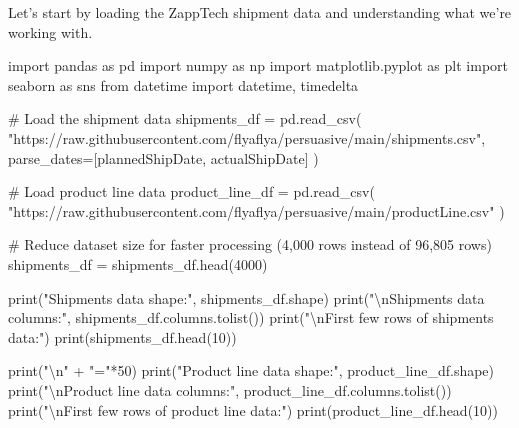 \documentclass[
]{article}
\newenvironment{Shaded}{\begin{snugshade}}{\end{snugshade}}
\newcommand{\BuiltInTok}[1]{\textcolor[rgb]{0.00,0.23,0.31}{#1}}
\newcommand{\CharTok}[1]{\textcolor[rgb]{0.13,0.47,0.30}{#1}}
\newcommand{\CommentTok}[1]{\textcolor[rgb]{0.37,0.37,0.37}{#1}}
\newcommand{\DecValTok}[1]{\textcolor[rgb]{0.68,0.00,0.00}{#1}}
\newcommand{\ImportTok}[1]{\textcolor[rgb]{0.00,0.46,0.62}{#1}}
\newcommand{\NormalTok}[1]{\textcolor[rgb]{0.00,0.23,0.31}{#1}}
\newcommand{\OperatorTok}[1]{\textcolor[rgb]{0.37,0.37,0.37}{#1}}
\newcommand{\StringTok}[1]{\textcolor[rgb]{0.13,0.47,0.30}{#1}}
\begin{document}
Let's start by loading the ZappTech shipment data and understanding what
we're working with.

\label{load-data}
\begin{Shaded}
\begin{Highlighting}[]
\ImportTok{import}\NormalTok{ pandas }\ImportTok{as}\NormalTok{ pd}
\ImportTok{import}\NormalTok{ numpy }\ImportTok{as}\NormalTok{ np}
\ImportTok{import}\NormalTok{ matplotlib.pyplot }\ImportTok{as}\NormalTok{ plt}
\ImportTok{import}\NormalTok{ seaborn }\ImportTok{as}\NormalTok{ sns}
\ImportTok{from}\NormalTok{ datetime }\ImportTok{import}\NormalTok{ datetime, timedelta}

\CommentTok{\# Load the shipment data}
\NormalTok{shipments\_df }\OperatorTok{=}\NormalTok{ pd.read\_csv(}
    \StringTok{"https://raw.githubusercontent.com/flyaflya/persuasive/main/shipments.csv"}\NormalTok{, }
\NormalTok{    parse\_dates}\OperatorTok{=}\NormalTok{[}\StringTok{\textquotesingle{}plannedShipDate\textquotesingle{}}\NormalTok{, }\StringTok{\textquotesingle{}actualShipDate\textquotesingle{}}\NormalTok{]}
\NormalTok{)}

\CommentTok{\# Load product line data}
\NormalTok{product\_line\_df }\OperatorTok{=}\NormalTok{ pd.read\_csv(}
    \StringTok{"https://raw.githubusercontent.com/flyaflya/persuasive/main/productLine.csv"}
\NormalTok{)}

\CommentTok{\# Reduce dataset size for faster processing (4,000 rows instead of 96,805 rows)}
\NormalTok{shipments\_df }\OperatorTok{=}\NormalTok{ shipments\_df.head(}\DecValTok{4000}\NormalTok{)}

\BuiltInTok{print}\NormalTok{(}\StringTok{"Shipments data shape:"}\NormalTok{, shipments\_df.shape)}
\BuiltInTok{print}\NormalTok{(}\StringTok{"}\CharTok{\textbackslash{}n}\StringTok{Shipments data columns:"}\NormalTok{, shipments\_df.columns.tolist())}
\BuiltInTok{print}\NormalTok{(}\StringTok{"}\CharTok{\textbackslash{}n}\StringTok{First few rows of shipments data:"}\NormalTok{)}
\BuiltInTok{print}\NormalTok{(shipments\_df.head(}\DecValTok{10}\NormalTok{))}

\BuiltInTok{print}\NormalTok{(}\StringTok{"}\CharTok{\textbackslash{}n}\StringTok{"} \OperatorTok{+} \StringTok{"="}\OperatorTok{*}\DecValTok{50}\NormalTok{)}
\BuiltInTok{print}\NormalTok{(}\StringTok{"Product line data shape:"}\NormalTok{, product\_line\_df.shape)}
\BuiltInTok{print}\NormalTok{(}\StringTok{"}\CharTok{\textbackslash{}n}\StringTok{Product line data columns:"}\NormalTok{, product\_line\_df.columns.tolist())}
\BuiltInTok{print}\NormalTok{(}\StringTok{"}\CharTok{\textbackslash{}n}\StringTok{First few rows of product line data:"}\NormalTok{)}
\BuiltInTok{print}\NormalTok{(product\_line\_df.head(}\DecValTok{10}\NormalTok{))}
\end{Highlighting}
\end{Shaded}
\end{document}
